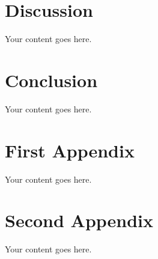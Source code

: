 \documentclass[12pt,lot,lof]{quthesis}
\begin{document}
\chapter{Discussion}
Your content goes here.

\chapter{Conclusion}
Your content goes here.

{
\singlespacing


\cleardoublepage
\ifdefined{}
\else
\fi
{}


}


\begin{appendices}



\chapter{First Appendix}
Your content goes here.

\chapter{Second Appendix}
Your content goes here.

\end{appendices}
\end{document}
